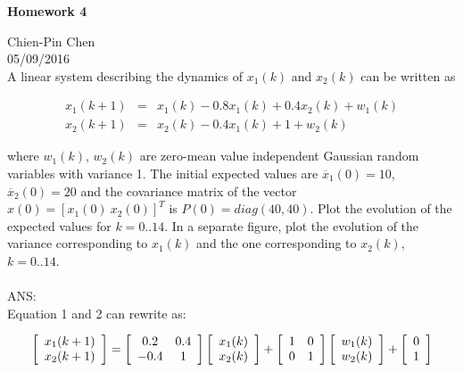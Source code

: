 \documentclass{article}
\begin{document}
 
\begin{center}
{\bf \Large  Homework 4} \\
\end{center}
Chien-Pin Chen\\
05/09/2016\\

 A linear system describing the dynamics of 
$x_1(k)$ and $x_2(k)$ can be written as

\begin{eqnarray}
  x_1(k+1) &=& x_1(k)-0.8x_1(k)+0.4x_2(k)+w_1(k) \\
  x_2(k+1) &=& x_2(k)-0.4x_1(k)+1+w_2(k) 
\end{eqnarray}

\noindent where $w_1(k)$, $w_2(k)$ are zero-mean value independent Gaussian random 
variables with variance 1. The initial expected values are $\overline{x}_1(0) = 10$, 
$\overline{x}_2(0) = 20$ and the covariance matrix of the vector $x(0) = [x_1(0)\ x_2(0)]^T$
is $P(0) = diag(40, 40)$. Plot the evolution of the expected values for $k=0..14$. In a separate figure, plot the evolution of the variance corresponding to $x_1(k)$ and the one corresponding to $x_2(k)$, $k=0..14$.  \\ \\
ANS:\\
Equation 1 and  2 can rewrite as:

\begin{eqnarray}
	\left[ {\begin{array}{*{20}c}
	   {x_1 (k + 1)}  \\
	   {x_2 (k + 1)}  \\
	\end{array}} \right] = \left[ {\begin{array}{*{20}c}
	   {0.2} & {0.4}  \\
	   { - 0.4} & 1  \\
	\end{array}} \right]\left[ {\begin{array}{*{20}c}
	   {x_1 (k)}  \\
	   {x_2 (k)}  \\
	\end{array}} \right] + \left[ {\begin{array}{*{20}c}
	   1 & 0  \\
	   0 & 1  \\
	\end{array}} \right]\left[ {\begin{array}{*{20}c}
	   {w_1 (k)}  \\
	   {w_2 (k)}  \\
	\end{array}} \right] + \left[ {\begin{array}{*{20}c}
	   0  \\
	   1  \\
	\end{array}} \right]
\end{eqnarray}
\end{document}

